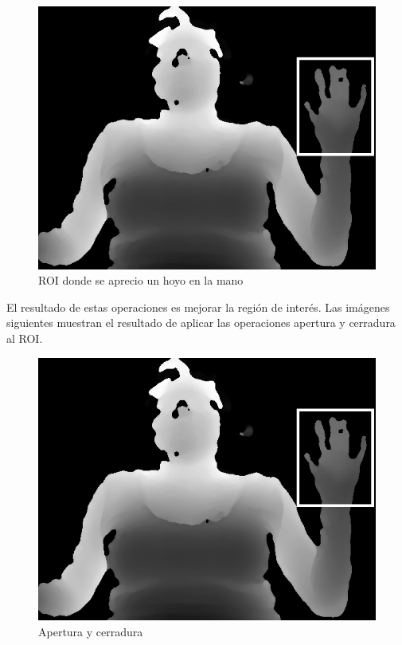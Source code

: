 \begin{figure}[h!]
\begin{center}
\includegraphics[scale=.5]{./Figures/roi.png}
\end{center}
\caption{ROI donde se aprecio un hoyo en la mano}
\label{fig:RuidoHoyo}
\end{figure}  


El resultado de estas operaciones es mejorar la región de interés. Las imágenes siguientes muestran el resultado de aplicar las operaciones apertura y cerradura al ROI. 

\begin{figure}[!h]
\begin{center}
\includegraphics[scale=.5]{./Figures/roi.png}
\end{center}
\caption{Apertura y cerradura}
\label{fig:ImagenOpenClose}
\end{figure}  

